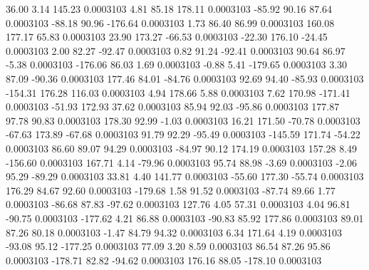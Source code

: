        36.00        3.14      145.23     0.0003103
        4.81       85.18      178.11     0.0003103
      -85.92       90.16       87.64     0.0003103
      -88.18       90.96     -176.64     0.0003103
        1.73       86.40       86.99     0.0003103
      160.08      177.17       65.83     0.0003103
       23.90      173.27      -66.53     0.0003103
      -22.30      176.10      -24.45     0.0003103
        2.00       82.27      -92.47     0.0003103
        0.82       91.24      -92.41     0.0003103
       90.64       86.97       -5.38     0.0003103
     -176.06       86.03        1.69     0.0003103
       -0.88        5.41     -179.65     0.0003103
        3.30       87.09      -90.36     0.0003103
      177.46       84.01      -84.76     0.0003103
       92.69       94.40      -85.93     0.0003103
     -154.31      176.28      116.03     0.0003103
        4.94      178.66        5.88     0.0003103
        7.62      170.98     -171.41     0.0003103
      -51.93      172.93       37.62     0.0003103
       85.94       92.03      -95.86     0.0003103
      177.87       97.78       90.83     0.0003103
      178.30       92.99       -1.03     0.0003103
       16.21      171.50      -70.78     0.0003103
      -67.63      173.89      -67.68     0.0003103
       91.79       92.29      -95.49     0.0003103
     -145.59      171.74      -54.22     0.0003103
       86.60       89.07       94.29     0.0003103
      -84.97       90.12      174.19     0.0003103
      157.28        8.49     -156.60     0.0003103
      167.71        4.14      -79.96     0.0003103
       95.74       88.98       -3.69     0.0003103
       -2.06       95.29      -89.29     0.0003103
       33.81        4.40      141.77     0.0003103
      -55.60      177.30      -55.74     0.0003103
      176.29       84.67       92.60     0.0003103
     -179.68        1.58       91.52     0.0003103
      -87.74       89.66        1.77     0.0003103
      -86.68       87.83      -97.62     0.0003103
      127.76        4.05       57.31     0.0003103
        4.04       96.81      -90.75     0.0003103
     -177.62        4.21       86.88     0.0003103
      -90.83       85.92      177.86     0.0003103
       89.01       87.26       80.18     0.0003103
       -1.47       84.79       94.32     0.0003103
        6.34      171.64        4.19     0.0003103
      -93.08       95.12     -177.25     0.0003103
       77.09        3.20        8.59     0.0003103
       86.54       87.26       95.86     0.0003103
     -178.71       82.82      -94.62     0.0003103
      176.16       88.05     -178.10     0.0003103
